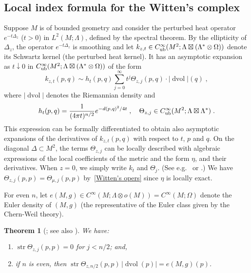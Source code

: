 \documentclass{memo-l}
\theoremstyle{plain}
\newtheorem{thm}{Theorem}[section]
\theoremstyle{definition}
\theoremstyle{remark}
\newcommand{\dvol}{\operatorname{dvol}}
\newcommand{\str}{\operatorname{str}}
\newcommand{\Cinftyub}{C^\infty_{\text{\rm ub}}}
\numberwithin{section}{chapter}
\numberwithin{equation}{section}%
\begin{document}
\subsection{Local index formula for the Witten's complex}\label{ss: local index formulae}

Suppose $M$ is of bounded geometry and consider the perturbed heat operator $e^{-t\Delta_z}$ ($t>0$) in $L^2(M;\Lambda)$, defined by the spectral theorem. By the ellipticity of $\Delta_z$, the operator $e^{-t\Delta_z}$ is smoothing and let $k_{z,t}\in\Cinftyub(M^2;\Lambda\boxtimes(\Lambda^*\otimes\Omega))$ denote its Schwartz kernel (the perturbed heat kernel). It has an asymptotic expansion as $t\downarrow0$ in $\Cinftyub(M^2;\Lambda\boxtimes(\Lambda^*\otimes\Omega))$ of the form
\begin{equation}\label{asymptotic expansion}
k_{z,t}(p,q)\sim h_t(p,q)\sum_{j=0}^\infty t^j\Theta_{z,j}(p,q)\cdot|{\dvol}|(q)\;,
\end{equation}
where $|{\dvol}|$ denotes the Riemannian density and
\[
h_t(p,q)=\frac{1}{(4\pi t)^{n/2}}e^{-d(p,q)^2/4t}\;,\quad\Theta_{z,j}\in\Cinftyub(M^2;\Lambda\boxtimes\Lambda^*)\;.
\]
This expression can be formally differentiated to obtain also asymptotic expansions of the derivatives of $k_{z,t}(p,q)$ with respect to $t$, $p$ and $q$. On the diagonal $\Delta\subset M^2$, the terms $\Theta_{z,j}$ can be locally described with algebraic expressions of the local coefficients of the metric and the form $\eta$, and their derivatives. When $z=0$, we simply write $k_t$ and $\Theta_j$. (See e.g.\ \cite[Section~1.8.1]{Gilkey1995} or \cite[Section~2.5]{BerlineGetzlerVergne2004}.) We have $\Theta_{z,j}(p,p)=\Theta_{\mu,j}(p,p)$ by~\eqref{Witten's opers} since $\eta$ is locally exact.

For even $n$, let $e(M,g)\in C^\infty(M;\Lambda\otimes o(M))=C^\infty(M;\Omega)$ denote the Euler density of $(M,g)$ (the representative of the Euler class given by the Chern-Weil theory).

\begin{thm}[{\cite[Theorem 13.4]{BismutZhang1992}; see also \cite[Theorem~1.5]{AlvGilkey2021a}}]\label{t: e_z l}
We have:
\begin{enumerate}[{\rm(i)}]
\item\label{i: str Theta_z j(p p) = 0} $\str\Theta_{z,j}(p,p)=0$ for $j<n/2$; and,
\item\label{i: str Theta_z n/2(p p) |dvol(p)| = e(M g)(p)} if $n$ is even, then $\str\Theta_{z,n/2}(p,p)\,|\dvol(p)|=e(M,g)(p)$.
\end{enumerate}
\end{thm} 
\end{document}
